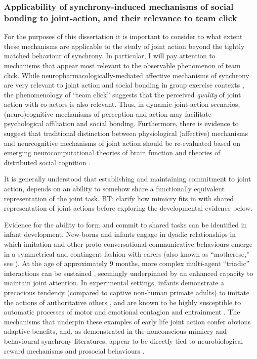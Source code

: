 \begin{CJK}{UTF8}{gbsn}
\subsubsection{Applicability of synchrony-induced mechanisms of social bonding to joint-action, and their relevance to team click}
For the purposes of this dissertation it is important to consider to what extent these mechanisms are applicable to the study of joint action beyond the tightly matched behaviour of synchrony.  In particular, I will pay attention to mechanisms that appear most relevant to the observable phenomenon of team click. While neuropharmacologically-mediated affective mechanisms of synchrony are very relevant to joint action and social bonding in group exercise contexts \citep[see]{Cohen2009,Sullivan2013,Tarr2015}, the phenomenology of ``team click'' suggests that the perceived \textit{quality} of joint action with co-actors is also relevant.  Thus, in dynamic joint-action scenarios, (neuro)cognitive mechanisms of perception and action may facilitate psychological affiliation and social bonding.  Furthermore, there is evidence to suggest that traditional distinction between physiological (affective) mechanisms and neurcognitive mechanisms of joint action should be re-evaluated based on emerging neurocomputational theories of brain function and theories of distributed social cognition \citep{Pessoa2013,Pessoa2014,Miller2017}.


It is generally understood that establishing and maintaining commitment to joint action, depends on an ability to somehow share a functionally equivalent representation of the joint task\citep{Vesper2010,Michael2016}.  BT: clarify how mimicry fits in with shared representation of joint actions before exploring the developmental evidence below.

Evidence for the ability to form and commit to shared tasks can be identified in infant development.  New-borns and infants engage in dyadic relationships in which imitation and other proto-conversational communicative behaviours emerge in a symmetrical and contingent fashion with carers (also known as ``motherese,'' see \cite{Braten2007}). At the age of approximately 9 months, more complex multi-agent ``triadic'' interactions can be sustained \citep{Colle2008}, seemingly underpinned by an enhanced capacity to maintain joint attention.
In experimental settings, infants demonstrate a precocious tendency (compared to captive non-human primate adults) to imitate the actions of authoritative others \citep{Tomasello2014}, and are known to be highly susceptible to automatic processes of motor and emotional contagion and entrainment \citep{Bargh2012}. The mechanisms that underpin these examples of early life joint action confer obvious adaptive benefits, and, as demonstrated in the nonconscious mimicry and behavioural synchrony literatures, appear to be directly tied to neurobiological reward mechanisms and prosocial behaviours \citep{Hurley2008,Launay2016}.


\end{CJK}

